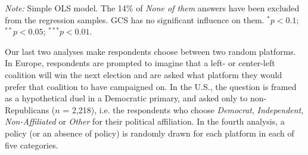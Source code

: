 \documentclass{nature}
\newenvironment{stretchpars}{\par\setlength{\parfillskip}{0pt}}{\par} %
\begin{document}
\begin{table} %
  \caption[Influence of the GCS on electoral prospects]{Preference for a progressive platform depending on whether it includes the GCS or not. (Question 28 in Supplementary Section D) 
Which of these candidates would you vote for? \textit{A; B; None of them} \\
} %
  \makebox[\textwidth][c]{}\label{tab:conjoint_c}
  {\footnotesize \textit{Note:} Simple OLS model. The 14\% of \textit{None of them} answers have been excluded from the regression samples. GCS has no significant influence on them. $^{*}p<0.1$; $^{**} p<0.05$; $^{***} p<0.01$. 
  }
\end{table}
Our last two analyses  make respondents choose between two random platforms. In Europe, respondents are prompted to imagine that a left- or center-left coalition will win the next election and are asked what platform they would prefer that coalition to have campaigned on. In the U.S., the question is framed as a hypothetical duel in a Democratic primary, and asked only to non-Republicans ($n$ = 2,218), i.e. the respondents who choose \textit{Democrat}, \textit{Independent}, \textit{Non-Affiliated} or \textit{Other} for their political affiliation. In the fourth analysis, a policy (or an absence of policy) is randomly drawn for each platform in each of five categories.%
 
\end{document}
